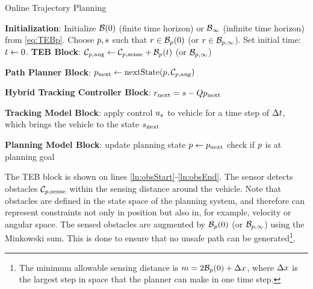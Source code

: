 \begin{algorithm}	
	\caption{Online Trajectory Planning}
	\label{alg:algOnline}
	\begin{algorithmic}[1]
		\STATE \textbf{Initialization}: \label{ln:Istart}
 		\STATE Initialize $\mathcal B(0)$ (finite time horizon) or $\mathcal B_\infty$ (infinite time horizon) from \eqref{eq:TEBp}. 
		\STATE Choose $p, s$ such that $r \in  \mathcal B_p(0)$ (or $r\in\mathcal B_{p,\infty}$).
    \STATE Set initial time: $t \leftarrow 0$. \label{ln:Iend}
		\STATE \textbf{TEB Block}: \label{ln:obsStart}
		\STATE $\mathcal C_{p,\text{aug}} \leftarrow \mathcal C_{p,\text{sense}} + \mathcal B_p(t)$ (or $\mathcal B_{p, \infty}$)\label{ln:obsEnd}
		
		\STATE \textbf{Path Planner Block}:\label{ln:plannerStart}
		\STATE $p_\text{next} \leftarrow \text{nextState}(p, \mathcal C_{p,\text{aug}})$\label{ln:plannerEnd}
		
		\STATE \textbf{Hybrid Tracking Controller Block}:\label{ln:controllerStart}
		\STATE $r_\text{next} = s - Qp_\text{next}$
		
		\ELSE {} 
           \ENDIF \label{ln:controllerEnd}
		
		\STATE \textbf{Tracking Model Block}: \label{ln:trackingStart}
		\STATE apply control $u_s$ to vehicle for a time step of $\Delta t$, which brings the vehicle to the state $s_\text{next}$ \label{ln:trackingEnd}
		
		\STATE \textbf{Planning Model Block}:\label{ln:planningStart}
		\STATE update planning state $p \leftarrow p_\text{next}$
		\STATE check if $p$ is at planning goal \label{ln:planningEnd}
		\ENDWHILE
	\end{algorithmic}
\end{algorithm}
The TEB block is shown on lines \ref{ln:obsStart}-\ref{ln:obsEnd}. 
The sensor detects obstacles $\mathcal C_{p,\text{sense}}$ within the sensing distance around the vehicle.
Note that obstacles are defined in the state space of the planning system, and therefore can represent constraints not only in position but also in, for example, velocity or angular space.
The sensed obstacles are augmented by $\mathcal B_p(0)$ (or $\mathcal B_{p, \infty}$) using the Minkowski sum. 
This is done to ensure that no unsafe path can be generated\footnote{The minimum allowable sensing distance is $m = 2\mathcal B_p(0) + \Delta x$, where $\Delta x$ is the largest step in space that the planner can make in one time step.}.

